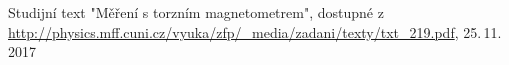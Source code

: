 \documentclass[0-protokol.tex]{subfiles}
\begin{document}
\begin{thebibliography}{}

Studijní text "Měření s torzním magnetometrem", dostupné z\\ \url{http://physics.mff.cuni.cz/vyuka/zfp/_media/zadani/texty/txt_219.pdf}, 25.\,11.\,2017

\end{thebibliography}
\end{document}
